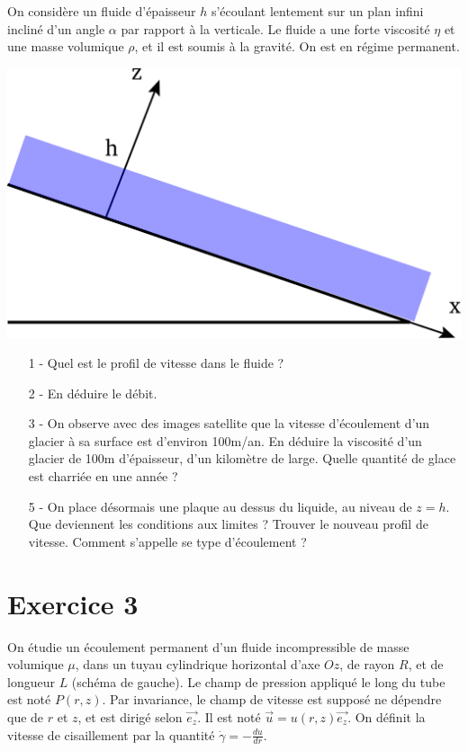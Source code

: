 \documentclass{report}
\begin{document}
On considère un fluide d'épaisseur $h$ s'écoulant lentement sur un plan infini incliné d'un angle $\alpha$ par rapport à la verticale. Le fluide a une forte viscosité $\eta$ et une masse volumique $\rho$, et il est soumis à la gravité. On est en régime permanent.

\begin{center}
	\includegraphics[scale=0.3]{ecoulement.pdf}
\end{center}

\begin{itemize}
	\item[1 -] Quel est le profil de vitesse dans le fluide ? 
	\item[2 -] En déduire le débit. 
	\item[3 -] On observe avec des images satellite que la vitesse d'écoulement d'un glacier à sa surface est d'environ 100m/an. En déduire la viscosité d'un glacier de 100m d'épaisseur, d'un kilomètre de large. Quelle quantité de glace est charriée en une année ?
	\item[5 -] On place désormais une plaque au dessus du liquide, au niveau de $z=h$. Que deviennent les conditions aux limites ? Trouver le nouveau profil de vitesse. Comment s'appelle se type d'écoulement ?

\end{itemize}

\newpage

\section*{Exercice 3}

On étudie un écoulement permanent d'un fluide incompressible de masse volumique $\mu$, dans un tuyau cylindrique horizontal d'axe $Oz$, de rayon $R$, et de longueur $L$ (schéma de gauche). Le champ de pression appliqué le long du tube est noté $P(r,z)$. Par invariance, le champ de vitesse est supposé ne dépendre que de $r$ et $z$, et est dirigé selon $\vec{e_z}$. Il est noté $\vec{u}=u(r,z)\vec{e_z}$. On définit la vitesse de cisaillement par la quantité $\dot{\gamma}=-\frac{du}{dr}$. 
\end{document}
